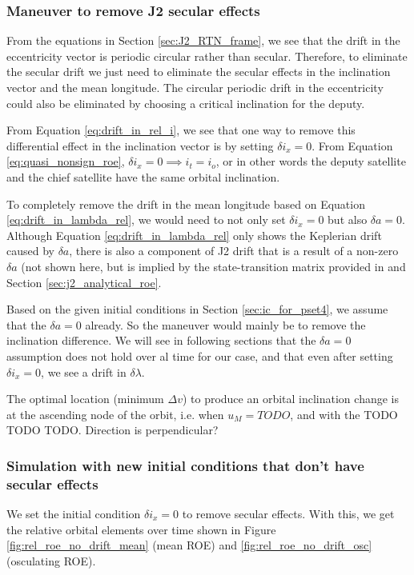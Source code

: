 \subsubsection{Maneuver to remove J2 secular effects}\label{sec:J2_maneuver}
From the equations in Section \ref{sec:J2_RTN_frame}, we see that the drift in the eccentricity vector is periodic circular rather than secular. Therefore, to eliminate the secular drift we just need to eliminate the secular effects in the inclination vector and the mean longitude. The circular periodic drift in the eccentricity could also be eliminated by choosing a critical inclination for the deputy. 

From Equation \ref{eq:drift_in_rel_i}, we see that one way to remove this differential effect in the inclination vector is by setting $\delta i_x = 0$. From Equation \ref{eq:quasi_nonsign_roe}, $\delta i_x = 0 \implies i_t = i_o$, or in other words the deputy satellite and the chief satellite have the same orbital inclination. 

To completely remove the drift in the mean longitude based on Equation \ref{eq:drift_in_lambda_rel}, we would need to not only set $\delta i_x = 0$ but also  $\delta a = 0$. Although Equation \ref{eq:drift_in_lambda_rel} only shows the Keplerian drift caused by $\delta a$, there is also a component of J2 drift that is a result of a non-zero $\delta a$ (not shown here, but is implied by the state-transition matrix provided in \cite{koenig2017new} and Section \ref{sec:j2_analytical_roe}. 

Based on the given initial conditions in Section \ref{sec:ic_for_pset4}, we assume that the $\delta a = 0$ already. So the maneuver would mainly be to remove the inclination difference. We will see in following sections that the $\delta a = 0$ assumption does not hold over al time for our case, and that even after setting $\delta i_x = 0$, we see a drift in $\delta \lambda$.

The optimal location (minimum $\Delta v$) to produce an orbital inclination change is at the ascending node of the orbit, i.e. when $u_M = TODO$, and with the TODO TODO TODO. Direction is perpendicular?

\subsubsection{Simulation with new initial conditions that don't have secular effects}

We set the initial condition $\delta i_x = 0$ to remove secular effects. With this, we get the relative orbital elements over time shown in Figure \ref{fig:rel_roe_no_drift_mean} (mean ROE) and \ref{fig:rel_roe_no_drift_osc} (osculating ROE).

